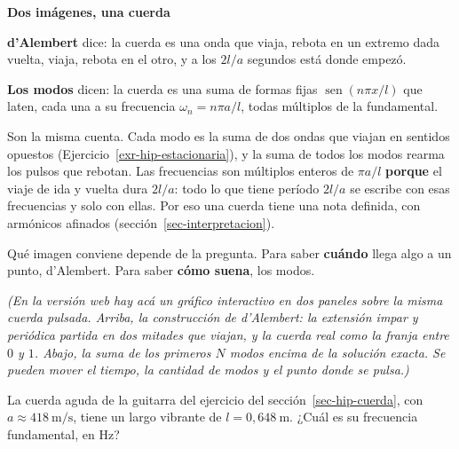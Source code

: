 \documentclass[
  spanish,
  a4paper,
]{scrbook}
\theoremstyle{definition}
\theoremstyle{plain}
\theoremstyle{definition}
\theoremstyle{plain}
\theoremstyle{definition}
\theoremstyle{remark}
\begin{document}
\begin{tcolorbox}[enhanced jigsaw, arc=.35mm, bottomrule=.15mm, breakable, colback=white, colframe=quarto-callout-important-color-frame, left=2mm, leftrule=.75mm, opacityback=0, rightrule=.15mm, toprule=.15mm]
\begin{minipage}[t]{5.5mm}
\textcolor{quarto-callout-important-color}{\faExclamation}
\end{minipage}%
\begin{minipage}[t]{\textwidth - 5.5mm}

\vspace{-3mm}\textbf{Dos imágenes, una cuerda}\vspace{3mm}

\textbf{d'Alembert} dice: la cuerda es una onda que viaja, rebota en un
extremo dada vuelta, viaja, rebota en el otro, y a los \(2l/a\) segundos
está donde empezó.

\textbf{Los modos} dicen: la cuerda es una suma de formas fijas
\(\operatorname{sen}(n\pi x/l)\) que laten, cada una a su frecuencia
\(\omega_n = n\pi a/l\), todas múltiplos de la fundamental.

Son la misma cuenta. Cada modo es la suma de dos ondas que viajan en
sentidos opuestos (Ejercicio~\ref{exr-hip-estacionaria}), y la suma de
todos los modos rearma los pulsos que rebotan. Las frecuencias son
múltiplos enteros de \(\pi a/l\) \textbf{porque} el viaje de ida y
vuelta dura \(2l/a\): todo lo que tiene período \(2l/a\) se escribe con
esas frecuencias y solo con ellas. Por eso una cuerda tiene una nota
definida, con armónicos afinados (sección~\ref{sec-interpretacion}).

Qué imagen conviene depende de la pregunta. Para saber \textbf{cuándo}
llega algo a un punto, d'Alembert. Para saber \textbf{cómo suena}, los
modos.

\end{minipage}%
\end{tcolorbox}

\emph{(En la versión web hay acá un gráfico interactivo en dos paneles
sobre la misma cuerda pulsada. Arriba, la construcción de d'Alembert: la
extensión impar y periódica partida en dos mitades que viajan, y la
cuerda real como la franja entre \(0\) y \(1\). Abajo, la suma de los
primeros \(N\) modos encima de la solución exacta. Se pueden mover el
tiempo, la cantidad de modos y el punto donde se pulsa.)}

La cuerda aguda de la guitarra del ejercicio del
sección~\ref{sec-hip-cuerda}, con \(a \approx 418\ \text{m/s}\), tiene
un largo vibrante de \(l = 0{,}648\ \text{m}\). ¿Cuál es su frecuencia
fundamental, en Hz?
\end{document}
